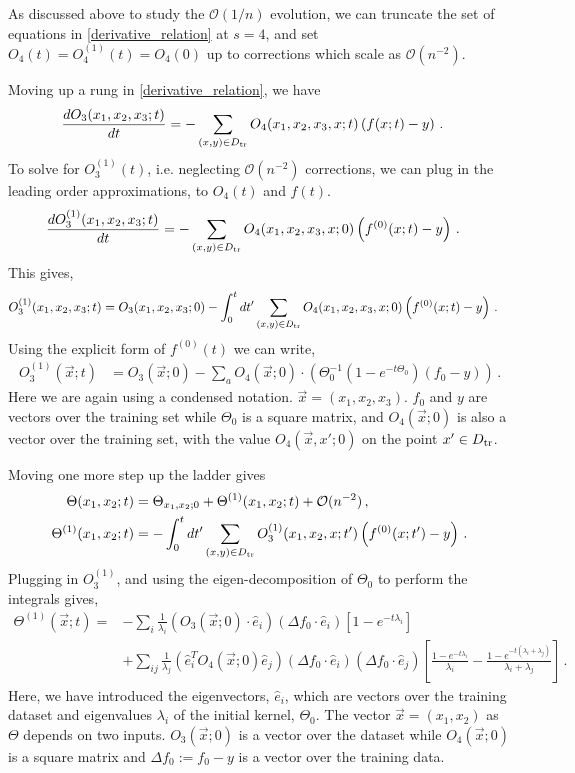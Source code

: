 \documentclass[english]{article}
\newcommand{\es}[2] {\begin{align} \label{#1} #2 \end{align}}
\begin{document}
As discussed above to study the $\mathcal{O}(1/n)$ evolution, we can truncate the set of equations in \eqref{derivative_relation} at $s=4$, and set $O_{4}(t)=O_{4}^{(1)}(t)=O_{4}(0)$ up to corrections which scale as $\mathcal{O}(n^{-2})$.

Moving up a rung in \eqref{derivative_relation}, we have
\es{truncated_eqs2}{
\frac{dO_3(x_1,x_2,x_3;t)}{dt}&=-\sum_{(x,y)\in D_{\rm tr}}O_4(x_1,x_2,x_3,x;t)\left(f(x;t)-y\right)\,.
}
To solve for $O_3^{(1)}(t)$, i.e. neglecting $\mathcal{O}(n^{-2})$ corrections, we can plug in the leading order approximations, to $O_4(t)$ and $f(t)$.
\es{truncated_eqs2_simp}{
\frac{dO_3^{(1)}(x_1,x_2,x_3;t)}{dt}&=-\sum_{(x,y)\in D_{\rm tr}}O_4(x_1,x_2,x_3,x;0)\left(f^{(0)}(x;t)-y\right)\,.
}
This gives,
\es{integrated_eqO1}{
  O^{(1)}_{3}(x_1,x_2,x_3;t)&=O_{3}(x_1,x_2,x_3;0)-\int_{0}^{t}dt^{\prime}\sum_{(x,y)\in D_{\rm tr}}O_{4}(x_1,x_2,x_3,x;0)\left(f^{(0)}(x;t)-y\right)\,.
 }
Using the explicit form of $f^{(0)}(t)$ we can write,
\es{expO1LO}{
  O^{(1)}_{3}(\vec{x};t)&=O_{3}(\vec{x};0)-\sum_{a}O_{4}(\vec{x};0)\cdot\left(\Theta^{-1}_{0}(1-e^{-t\Theta_{0}})(f_{0}-y)\right) \,.
  }
 Here we are again using a condensed notation. $\vec{x}=(x_1,x_2,x_3)$. $f_0$ and $y$ are vectors over the training set while $\Theta_0$ is a square matrix, and $O_{4}(\vec{x};0)$ is also a vector over the training set, with the value $O_4(\vec{x},x';0)$ on the point $x'\in D_{\rm tr}$.

Moving one more step up the ladder gives
\es{nlo_theta}{
  \Theta(x_1,x_2;t)&=\Theta_{x_1,x_2;0}+\Theta^{(1)}(x_1,x_2;t)+\mathcal{O}(n^{-2})\,,\nonumber\\
  \Theta^{(1)}(x_1,x_2;t) &= -\int_{0}^{t}dt^{\prime}\sum_{(x,y)\in D_{\rm tr}}O^{(1)}_{3}(x_1,x_2,x;t')\left(f^{(0)}(x;t')-y\right) \,.
}
Plugging in $O^{(1)}_{3}$, and using the eigen-decomposition of $\Theta_{0}$ to perform the integrals gives,
\begin{align}
\Theta^{(1)}(\vec{x};t)=&-\sum_{i}\frac{1}{\lambda_{i}}(O_{3}(\vec{x};0)\cdot\hat{e}_{i})(\Delta f_{0}\cdot\hat{e}_{i})\left[1-e^{-t\lambda_{i}}\right]\nonumber\\
&+\sum_{ij}\frac{1}{\lambda_{j}}(\hat{e}_{i}^{T}O_{4}(\vec{x};0)\hat{e}_{j})(\Delta f_{0}\cdot \hat{e}_{i})(\Delta f_{0}\cdot \hat{e}_{j})\left[\frac{1-e^{-t\lambda_{i}}}{\lambda_{i}}-\frac{1-e^{-t(\lambda_{i}+\lambda_{j})}}{\lambda_{i}+\lambda_{j}}\right]\,.\label{ThetaNLOExpint}
\end{align}
Here, we have introduced the eigenvectors, $\hat{e}_{i}$, which are vectors over the training dataset and eigenvalues $\lambda_{i}$ of the initial kernel, $\Theta_{0}$. The vector $\vec{x}=(x_1,x_2)$ as $\Theta$ depends on two inputs. $O_{3}(\vec{x};0)$ is a vector over the dataset while $O_{4}(\vec{x};0)$ is a square matrix and $\Delta f_{0}:=f_{0}-y$ is a vector over the training data.
\end{document}
